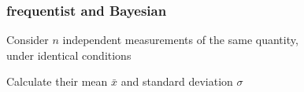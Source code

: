 \documentclass{beamer}              %
\begin{document}
\begin{frame}[fragile]
  \frametitle{frequentist and Bayesian}



  \begin{minipage}[t][0.2\textheight][t]{\textwidth}
    Consider $n$ independent measurements of the same quantity, \\under identical conditions

    Calculate their mean $\bar{x}$ and standard deviation $\sigma$
  \end{minipage} \\

  \begin{minipage}[t][0.2\textheight][t]{\textwidth}
  \end{minipage}

  \begin{minipage}[t][0.2\textheight][t]{\textwidth}

    \begin{minipage}[t]{0.48\textwidth}
    \end{minipage}%
    \hfill
    \begin{minipage}[t]{0.48\textwidth}
    \end{minipage}

  \end{minipage}

  \vfill
\end{frame}
\end{document}
